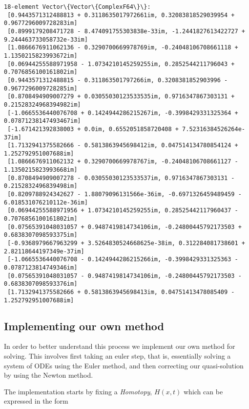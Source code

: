 \documentclass[11pt]{article}
\begin{document}
    
    \begin{Verbatim}[commandchars=\\\{\}]
18-element Vector\{Vector\{ComplexF64\}\}:
 [0.9443571312488813 + 0.3118635017972661im, 0.32083818529039954 + 0.9677296009728283im]
 [0.8999179208471728 - 8.474091755303838e-33im, -1.2441827613422727 + 9.244463733058732e-33im]
 [1.0866676911062136 - 0.3290700669978769im, -0.24048106708661118 + 1.1350215823993672im]
 [0.06944255588971958 - 1.0734210145259255im, 0.2852544211796043 + 0.7076856100161802im]
 [0.9443571312488815 - 0.311863501797266im, 0.3208381852903996 - 0.9677296009728285im]
 [0.8708494909007279 + 0.03055030123533535im, 0.9716347867303131 + 0.21528324968394982im]
 [-1.0665536440076708 + 0.1424944286215267im, -0.3998429331325364 + 0.07871238147493467im]
 [-1.671421392838003 + 0.0im, 0.6552051858720408 + 7.52316384526264e-37im]
 [1.7132941375582666 - 0.5813863945698412im, 0.047514134780854124 + 1.252792951007688im]
 [1.0866676911062132 + 0.3290700669978767im, -0.24048106708661127 - 1.1350215823993668im]
 [0.8708494909007278 - 0.03055030123533537im, 0.9716347867303131 - 0.2152832496839498im]
 [0.8209788924342627 - 1.88079096131566e-36im, -0.6971326459489459 - 6.018531076210112e-36im]
 [0.06944255588971956 + 1.0734210145259255im, 0.28525442117960437 - 0.7076856100161802im]
 [0.07565391048031057 + 0.9487419814734106im, -0.24800445792173503 + 0.6838307098593375im]
 [-0.9368979667963299 + 3.5264830524668625e-38im, 0.312284081738601 + 2.82118644197349e-37im]
 [-1.0665536440076708 - 0.1424944286215266im, -0.3998429331325363 - 0.0787123814749346im]
 [0.07565391048031057 - 0.9487419814734106im, -0.24800445792173503 - 0.6838307098593376im]
 [1.7132941375582666 + 0.5813863945698413im, 0.04751413478085409 - 1.252792951007688im]
    \end{Verbatim}

    
    \hypertarget{implementing-our-own-method}{%
\subsection{Implementing our own
method}\label{implementing-our-own-method}}

In order to better understand this process we implement our own method
for solving. This involves first taking an euler step, that is,
essentially solving a system of ODEs using the Euler method, and then
correcting our quasi-solution by using the Newton method.

The implementation starts by fixing a \emph{Homotopy}, \(H(x,t)\) which
can be expressed in the form
\end{document}
